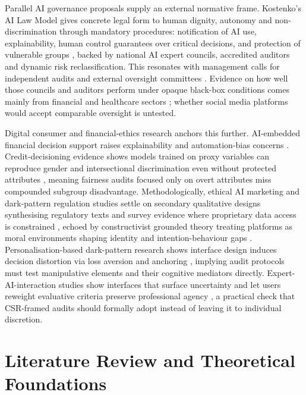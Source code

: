 \documentclass[11pt]{article}
\begin{document}
Parallel AI governance proposals supply an external normative frame. Kostenko's AI Law Model gives concrete legal form to human dignity, autonomy and non-discrimination through mandatory procedures: notification of AI use, explainability, human control guarantees over critical decisions, and protection of vulnerable groups \parencites[9]{2977039}, backed by national AI expert councils, accredited auditors and dynamic risk reclassification. This resonates with management calls for independent audits and external oversight committees \parencites[9]{2977039}[9]{7461574}. Evidence on how well those councils and auditors perform under opaque black-box conditions comes mainly from financial and healthcare sectors \parencites[9]{2977039}; whether social media platforms would accept comparable oversight is untested.

Digital consumer and financial-ethics research anchors this further. AI-embedded financial decision support raises explainability and automation-bias concerns \parencites[3]{4245543}[2]{2855351}. Credit-decisioning evidence shows models trained on proxy variables can reproduce gender and intersectional discrimination even without protected attributes \parencites[9]{5442231}[7]{6059812}, meaning fairness audits focused only on overt attributes miss compounded subgroup disadvantage. Methodologically, ethical AI marketing and dark-pattern regulation studies settle on secondary qualitative designs synthesising regulatory texts and survey evidence where proprietary data access is constrained \parencites[6]{6295677}[8]{8200246}, echoed by constructivist grounded theory treating platforms as moral environments shaping identity and intention-behaviour gaps \parencites[3]{4245543}[5]{4245543}. Personalisation-based dark-pattern research shows interface design induces decision distortion via loss aversion and anchoring \parencites[4]{7437483}, implying audit protocols must test manipulative elements and their cognitive mediators directly. Expert-AI-interaction studies show interfaces that surface uncertainty and let users reweight evaluative criteria preserve professional agency \parencites[6]{4268459}, a practical check that CSR-framed audits should formally adopt instead of leaving it to individual discretion.

\section{Literature Review and Theoretical Foundations}
\end{document}
